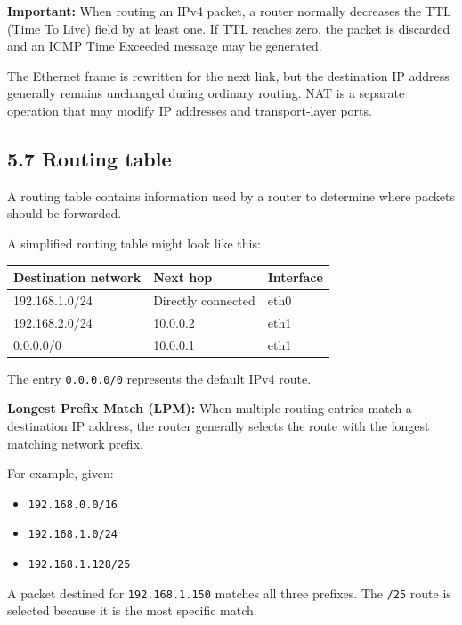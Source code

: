 \textbf{Important:} When routing an IPv4 packet, a router normally decreases the TTL (Time To Live) field by at least one. If TTL reaches zero, the packet is discarded and an ICMP Time Exceeded message may be generated.

The Ethernet frame is rewritten for the next link, but the destination IP address generally remains unchanged during ordinary routing. NAT is a separate operation that may modify IP addresses and transport-layer ports.

\subsection{5.7 Routing table}

A routing table contains information used by a router to determine where packets should be forwarded.

A simplified routing table might look like this:

\begin{table}[htbp]
\centering
\begin{tabularx}{\textwidth}{p{4.2cm} X X}
\toprule
\textbf{Destination network} & \textbf{Next hop} & \textbf{Interface} \\
\midrule
192.168.1.0/24 & Directly connected & eth0 \\
192.168.2.0/24 & 10.0.0.2 & eth1 \\
0.0.0.0/0 & 10.0.0.1 & eth1 \\
\bottomrule
\end{tabularx}
\end{table}

The entry \texttt{0.0.0.0/0} represents the default IPv4 route.

\textbf{Longest Prefix Match (LPM):} When multiple routing entries match a destination IP address, the router generally selects the route with the longest matching network prefix.

For example, given:

\begin{itemize}
    \item \texttt{192.168.0.0/16}
    \item \texttt{192.168.1.0/24}
    \item \texttt{192.168.1.128/25}
\end{itemize}

A packet destined for \texttt{192.168.1.150} matches all three prefixes. The \texttt{/25} route is selected because it is the most specific match.

